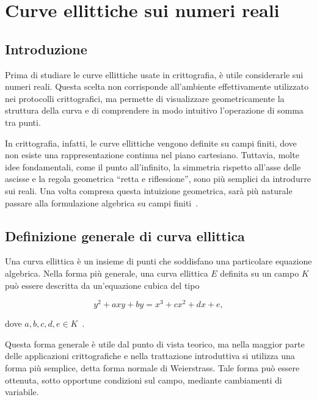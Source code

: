\documentclass[12pt,a4paper,oneside]{report}
\begin{document}
\chapter{Curve ellittiche sui numeri reali}

\section{Introduzione}

Prima di studiare le curve ellittiche usate in crittografia, è utile considerarle sui numeri reali. Questa scelta non corrisponde all'ambiente effettivamente utilizzato nei protocolli crittografici, ma permette di visualizzare geometricamente la struttura della curva e di comprendere in modo intuitivo l'operazione di somma tra punti.

In crittografia, infatti, le curve ellittiche vengono definite su campi finiti, dove non esiste una rappresentazione continua nel piano cartesiano. Tuttavia, molte idee fondamentali, come il punto all'infinito, la simmetria rispetto all'asse delle ascisse e la regola geometrica ``retta e riflessione'', sono più semplici da introdurre sui reali. Una volta compresa questa intuizione geometrica, sarà più naturale passare alla formulazione algebrica su campi finiti~\cite{margara_ec}.

\section{Definizione generale di curva ellittica}

Una curva ellittica è un insieme di punti che soddisfano una particolare equazione algebrica. Nella forma più generale, una curva ellittica \(E\) definita su un campo \(K\) può essere descritta da un'equazione cubica del tipo

\begin{equation}
    y^2 + axy + by = x^3 + cx^2 + dx + e,
\end{equation}

dove \(a,b,c,d,e \in K\)~\cite{margara_ec}.

Questa forma generale è utile dal punto di vista teorico, ma nella maggior parte delle applicazioni crittografiche e nella trattazione introduttiva si utilizza una forma più semplice, detta forma normale di Weierstrass. Tale forma può essere ottenuta, sotto opportune condizioni sul campo, mediante cambiamenti di variabile.
\end{document}
